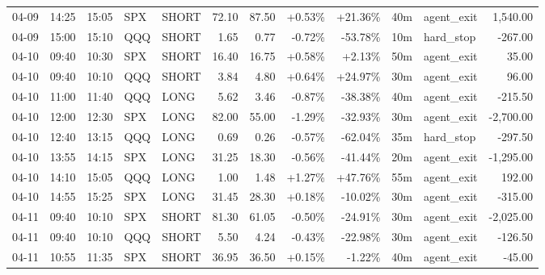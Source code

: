 \documentclass[11pt,a4paper,twoside]{article}
\begin{document}
\begin{center}
\begin{longtable}{>{\color{txtmain}}l l l l l r r r r r >{\color{txtmain}}l r}
04-09 & 14:25 & 15:05 & SPX & SHORT & 72.10 & 87.50 & \textcolor{wingreen}{+0.53\%} & \textcolor{wingreen}{+21.36\%} & 40m & agent\_exit & \textcolor{wingreen}{1,540.00} \\
04-09 & 15:00 & 15:10 & QQQ & SHORT & 1.65 & 0.77 & \textcolor{lossred}{-0.72\%} & \textcolor{lossred}{-53.78\%} & 10m & hard\_stop & \textcolor{lossred}{-267.00} \\
04-10 & 09:40 & 10:30 & SPX & SHORT & 16.40 & 16.75 & \textcolor{wingreen}{+0.58\%} & \textcolor{wingreen}{+2.13\%} & 50m & agent\_exit & \textcolor{wingreen}{35.00} \\
04-10 & 09:40 & 10:10 & QQQ & SHORT & 3.84 & 4.80 & \textcolor{wingreen}{+0.64\%} & \textcolor{wingreen}{+24.97\%} & 30m & agent\_exit & \textcolor{wingreen}{96.00} \\
04-10 & 11:00 & 11:40 & QQQ & LONG & 5.62 & 3.46 & \textcolor{lossred}{-0.87\%} & \textcolor{lossred}{-38.38\%} & 40m & agent\_exit & \textcolor{lossred}{-215.50} \\
04-10 & 12:00 & 12:30 & SPX & LONG & 82.00 & 55.00 & \textcolor{lossred}{-1.29\%} & \textcolor{lossred}{-32.93\%} & 30m & agent\_exit & \textcolor{lossred}{-2,700.00} \\
04-10 & 12:40 & 13:15 & QQQ & LONG & 0.69 & 0.26 & \textcolor{lossred}{-0.57\%} & \textcolor{lossred}{-62.04\%} & 35m & hard\_stop & \textcolor{lossred}{-297.50} \\
04-10 & 13:55 & 14:15 & SPX & LONG & 31.25 & 18.30 & \textcolor{lossred}{-0.56\%} & \textcolor{lossred}{-41.44\%} & 20m & agent\_exit & \textcolor{lossred}{-1,295.00} \\
04-10 & 14:10 & 15:05 & QQQ & LONG & 1.00 & 1.48 & \textcolor{wingreen}{+1.27\%} & \textcolor{wingreen}{+47.76\%} & 55m & agent\_exit & \textcolor{wingreen}{192.00} \\
04-10 & 14:55 & 15:25 & SPX & LONG & 31.45 & 28.30 & \textcolor{wingreen}{+0.18\%} & \textcolor{lossred}{-10.02\%} & 30m & agent\_exit & \textcolor{lossred}{-315.00} \\
04-11 & 09:40 & 10:10 & SPX & SHORT & 81.30 & 61.05 & \textcolor{lossred}{-0.50\%} & \textcolor{lossred}{-24.91\%} & 30m & agent\_exit & \textcolor{lossred}{-2,025.00} \\
04-11 & 09:40 & 10:10 & QQQ & SHORT & 5.50 & 4.24 & \textcolor{lossred}{-0.43\%} & \textcolor{lossred}{-22.98\%} & 30m & agent\_exit & \textcolor{lossred}{-126.50} \\
04-11 & 10:55 & 11:35 & SPX & SHORT & 36.95 & 36.50 & \textcolor{wingreen}{+0.15\%} & \textcolor{lossred}{-1.22\%} & 40m & agent\_exit & \textcolor{lossred}{-45.00} \\

\end{longtable}
\end{center}
\end{document}

